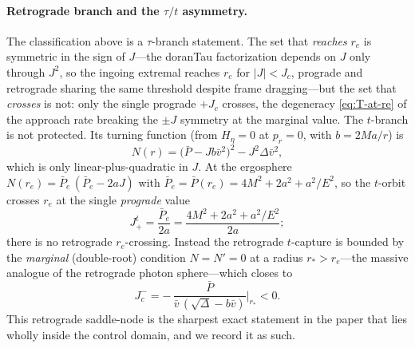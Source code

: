 \documentclass[12pt]{iopart}
\theoremstyle{plain}
\theoremstyle{definition}
\theoremstyle{remark}
\newcommand{\re}{r_{e}}
\newcommand{\Jc}{J_{c}}
\begin{document}
\paragraph{Retrograde branch and the $\tau/t$ asymmetry.} The classification above
is a $\tau$-branch statement. The set that \emph{reaches} $\re$ is symmetric in
the sign of $J$---the doranTau factorization depends on $J$ only through $J^2$, so
the ingoing extremal reaches $\re$ for $|J|<\Jc$, prograde and retrograde sharing
the same threshold despite frame dragging---but the set that \emph{crosses} is
not: only the single prograde $+\Jc$ crosses, the degeneracy
\eqref{eq:T-at-re} of the approach rate breaking the $\pm J$ symmetry at the
marginal value. The $t$-branch is not protected. Its turning function (from
$H_\eta=0$ at $p_r=0$, with $b=2Ma/r$) is
\begin{equation}
    N(r)=\big(\bar P-Jb\bar v^2\big)^2-J^2\Delta\bar v^2,
    \label{eq:tbranch-turn}
\end{equation}
which is only linear-plus-quadratic in $J$. At the ergosphere
$N(\re)=\bar P_e\,(\bar P_e-2aJ)$ with
$\bar P_e=\bar P(\re)=4M^2+2a^2+a^2/E^2$, so the $t$-orbit crosses $\re$ at the
single \emph{prograde} value
\begin{equation}
    J_+^{t}=\frac{\bar P_e}{2a}=\frac{4M^2+2a^2+a^2/E^2}{2a};
    \label{eq:Jplus-t}
\end{equation}
there is no retrograde $r_e$-crossing. Instead the retrograde $t$-capture is
bounded by the \emph{marginal} (double-root) condition $N=N'=0$ at a radius
$r_*>\re$---the massive analogue of the retrograde photon sphere---which closes
to
\begin{equation}
    J_c^{-}=-\,\frac{\bar P}{\bar v\,(\sqrt\Delta-b\bar v)}\bigg|_{r_*}<0 .
    \label{eq:Jc-minus}
\end{equation}
This retrograde saddle-node is the sharpest exact statement in the paper that
lies wholly inside the control domain, and we record it as such.
\end{document}
